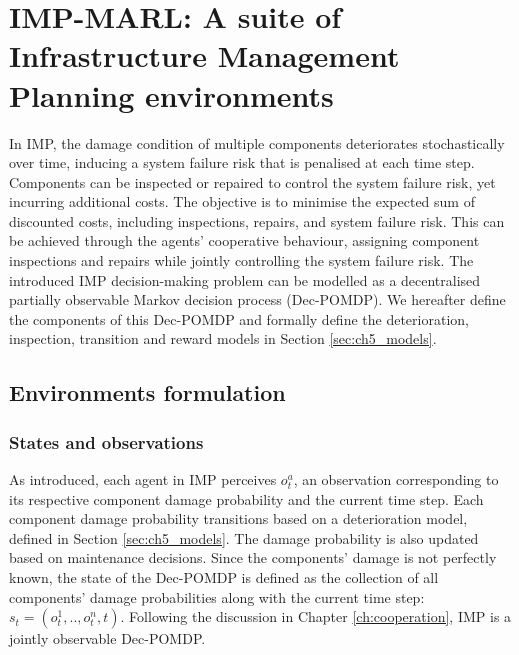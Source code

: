 \section{IMP-MARL: A suite of Infrastructure Management Planning environments} \label{sec:ch5_imp}

In IMP, the damage condition of multiple components deteriorates stochastically over time, inducing a system failure risk that is penalised at each time step.
Components can be inspected or repaired to control the system failure risk, yet incurring additional costs.
The objective is to minimise the expected sum of discounted costs, including inspections, repairs, and system failure risk.
This can be achieved through the agents' cooperative behaviour, assigning component inspections and repairs while jointly controlling the system failure risk.
The introduced IMP decision-making problem can be modelled as a decentralised partially observable Markov decision process (Dec-POMDP).
We hereafter define the components of this Dec-POMDP and formally define the deterioration, inspection, transition and reward models in Section \ref{sec:ch5_models}.

\subsection{Environments formulation}
\label{sec:env_formulation}

\subsubsection{States and observations}
As introduced, each agent in IMP perceives $o^a_t$, an observation corresponding to its respective component damage probability and the current time step.
Each component damage probability transitions based on a deterioration model, defined in Section \ref{sec:ch5_models}.
The damage probability is also updated based on maintenance decisions.
Since the components' damage is not perfectly known, the state of the Dec-POMDP is defined as the collection of all components' damage probabilities along with the current time step: $s_t = (o_t^1, .., o_t^n, t)$.
Following the discussion in Chapter \ref{ch:cooperation}, IMP is a jointly observable Dec-POMDP.

